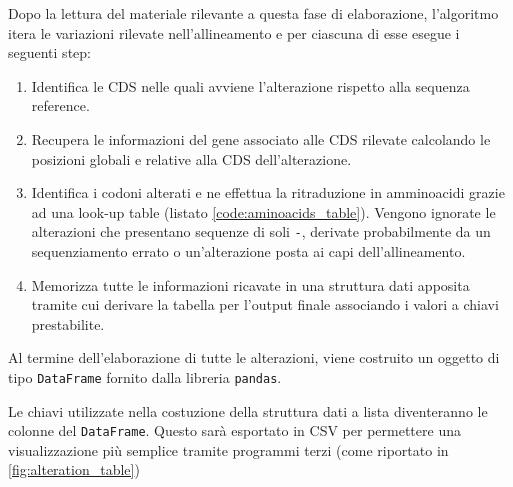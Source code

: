 \documentclass[11pt,italian]{article}
\begin{document}
\noindent
Dopo la lettura del materiale rilevante a questa fase di elaborazione, l'algoritmo itera le variazioni rilevate nell'allineamento e per ciascuna di esse esegue i seguenti step:
\begin{enumerate}
  \item Identifica le CDS nelle quali avviene l'alterazione rispetto alla sequenza reference.
  \item Recupera le informazioni del gene associato alle CDS rilevate calcolando le posizioni globali e relative alla CDS dell'alterazione.
  \item Identifica i codoni alterati e ne effettua la ritraduzione in amminoacidi grazie ad una look-up table (listato \ref{code:aminoacids_table}). Vengono ignorate le alterazioni che presentano sequenze di soli \lstinline{-}, derivate probabilmente da un sequenziamento errato o un'alterazione posta ai capi dell'allineamento.
  \item Memorizza tutte le informazioni ricavate in una struttura dati apposita tramite cui derivare la tabella per l'output finale associando i valori a chiavi prestabilite.
\end{enumerate}

\noindent
Al termine dell'elaborazione di tutte le alterazioni, viene costruito un oggetto di tipo \lstinline{DataFrame} fornito dalla libreria \lstinline{pandas}.

Le chiavi utilizzate nella costuzione della struttura dati a lista diventeranno le colonne del \lstinline{DataFrame}. Questo sarà esportato in CSV per permettere una visualizzazione più semplice tramite programmi terzi (come riportato in \cref{fig:alteration_table})

\newpage
\end{document}
